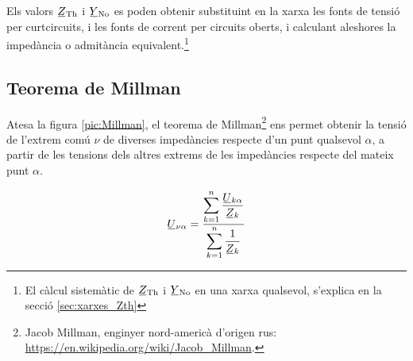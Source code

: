 Els valors $\cmplx{Z}\ped{Th}$ i  $\cmplx{Y}\ped{No}$ es poden
obtenir substituint en la xarxa  les fonts de tensió  per curtcircuits, i les fonts de corrent per circuits oberts, i calculant
aleshores la impedància o admitància equivalent.\footnote{El càlcul sistemàtic de $\cmplx{Z}\ped{Th}$ i  $\cmplx{Y}\ped{No}$ en una xarxa qualsevol, s'explica en la secció \ref{sec:xarxes_Zth}}

\subsection{Teorema de Millman}\label{sec:millman}

Atesa la figura \vref{pic:Millman}, el teorema
de Millman\footnote{Jacob Millman, enginyer nord-americà d'origen rus: \href{https://en.wikipedia.org/wiki/Jacob_Millman}{https:/\!\!/en.wikipedia.org/wiki/Jacob\_Millman}.} ens permet
obtenir la tensió de l'extrem comú $\nu$ de diverses impedàncies respecte d'un punt
qualsevol $\alpha$, a partir de les tensions dels altres extrems de les impedàncies respecte  del mateix punt $\alpha$.

\hfill
\begin{minipage}[b]{7cm}
    
    \label{pic:Millman}
\end{minipage}
\hfill
\begin{minipage}[b][4.5cm][t]{6cm}
    \begin{equation}
        \cmplx{U}_{\nu\alpha} = \frac{\displaystyle\sum_{k=1}^n \dfrac{\cmplx{U}_{k\alpha}}{\cmplx{Z}_k}} {\displaystyle\sum_{k=1}^n \dfrac{1}{\cmplx{Z}_k}}
        \label{eq:millman}
    \end{equation}
\end{minipage}

\vspace{5mm}

